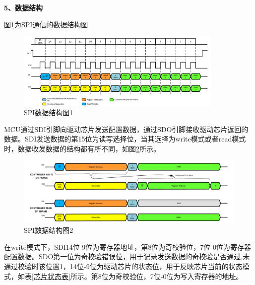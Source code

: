     
    \noindent
    \textbf{5、数据结构}\par
    图\ref{SPI数据结构图1}为SPI通信的数据结构图
    \begin{figure}[ht]
        \centering
        \includegraphics[width=10cm]{figure/SPI Frame.png}
        \caption{SPI数据结构图1}
        \label{SPI数据结构图1}
    \end{figure}
    MCU通过SDI引脚向驱动芯片发送配置数据，通过SDO引脚接收驱动芯片返回的数据。SDI发送数据的第15位为读写选择位，当其选择为write模式或者read模式时，数据收发数据的结构都有所不同，如图\ref{SPI数据结构图2}所示。
    \begin{figure}[ht]
        \centering
        \includegraphics[width=12cm]{figure/SPI Transfer Sequence.png}
        \caption{SPI数据结构图2}
        \label{SPI数据结构图2}
    \end{figure}
    在write模式下，SDI14位-9位为寄存器地址，第8位为奇校验位，7位-0位为寄存器配置数据。SDO第一位为奇校验错误位，用于记录发送数据的奇校验是否通过,未通过校验时该位置1，14位-9位为驱动芯片的状态位，用于反映芯片当前的状态模式，如表\ref{芯片状态表}所示。第8位为奇校验位，7位-0位为写入寄存器的地址。\par
    
